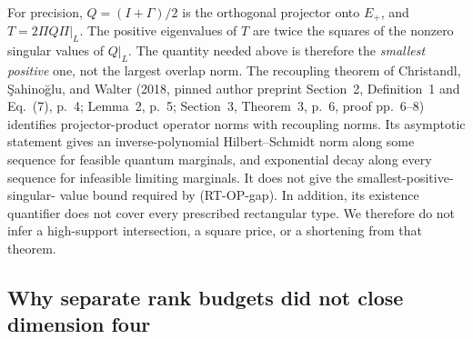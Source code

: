 For precision, $Q=(I+\Gamma)/2$ is the orthogonal projector onto
$E_+$, and $T=2\Pi Q\Pi|_L$. The positive eigenvalues of $T$ are
twice the squares of the nonzero singular values of $Q|_L$.
The quantity needed above is therefore the \emph{smallest positive}
one, not the largest overlap norm. The recoupling theorem of
Christandl, \c{S}ahino\u{g}lu, and Walter (2018, pinned author
preprint Section~2, Definition~1 and Eq.~(7), p.~4;
Lemma~2, p.~5; Section~3, Theorem~3, p.~6, proof pp.~6--8)
identifies projector-product operator norms with recoupling norms.
Its asymptotic statement gives an inverse-polynomial
Hilbert--Schmidt norm along some sequence for feasible quantum
marginals, and exponential decay along every sequence for infeasible
limiting marginals. It does not give the smallest-positive-singular-
value bound required by (RT-OP-gap). In addition, its existence
quantifier does not cover every prescribed rectangular type.
We therefore do not infer a high-support intersection, a square
price, or a shortening from that theorem.

\subsection{Why separate rank budgets did not close dimension four}

